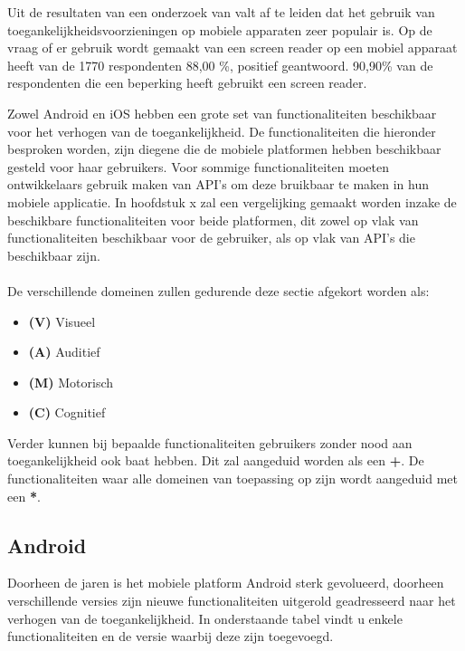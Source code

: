 Uit de resultaten van een onderzoek van \textcite{webAIMSurvey} valt af te leiden dat het gebruik van toegankelijkheidsvoorzieningen op mobiele apparaten zeer populair is. Op de vraag of er gebruik wordt gemaakt van een screen reader op een mobiel apparaat heeft van de 1770 respondenten 88,00 \%, positief geantwoord. 90,90\% van de respondenten die een beperking heeft gebruikt een screen reader.


Zowel Android en iOS hebben een grote set van functionaliteiten beschikbaar voor het verhogen van de toegankelijkheid. De functionaliteiten die hieronder besproken worden, zijn diegene die de mobiele platformen hebben beschikbaar gesteld voor haar gebruikers. Voor sommige functionaliteiten moeten ontwikkelaars gebruik maken van \gls{API}'s om deze bruikbaar te maken in hun mobiele applicatie. In hoofdstuk x%
 zal een vergelijking gemaakt worden inzake de beschikbare functionaliteiten voor beide platformen, dit zowel op vlak van functionaliteiten beschikbaar voor de gebruiker, als op vlak van \gls{API}'s die beschikbaar zijn.
\\
\\
De verschillende domeinen zullen gedurende deze sectie afgekort worden als:
\begin{itemize}
    \item \textbf{(V)} Visueel 
    \item \textbf{(A)} Auditief 
    \item \textbf{(M)} Motorisch 
    \item \textbf{(C)} Cognitief
\end{itemize} 

Verder kunnen bij bepaalde functionaliteiten gebruikers zonder nood aan toegankelijkheid ook baat hebben. Dit zal aangeduid worden als een \textbf{+}. De functionaliteiten waar alle domeinen van toepassing op zijn wordt aangeduid met een \textbf{*}.
\newpage
\subsection{Android}

Doorheen de jaren is het mobiele platform Android sterk gevolueerd, doorheen verschillende versies zijn nieuwe functionaliteiten uitgerold geadresseerd naar het verhogen van de toegankelijkheid. In onderstaande tabel vindt u enkele functionaliteiten en de versie waarbij deze zijn toegevoegd.
\label{sec:Android}

